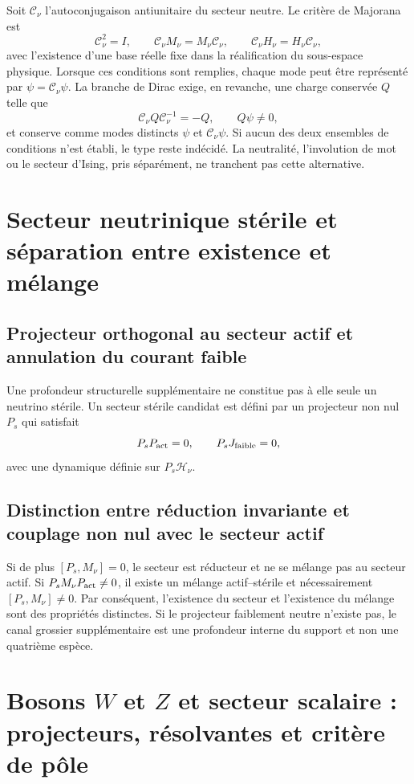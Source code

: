 Soit \(\mathcal C_\nu\) l'autoconjugaison antiunitaire du secteur neutre. Le
critère de Majorana est
\[
 \mathcal C_\nu^2=I,
 \qquad
 \mathcal C_\nu M_\nu=M_\nu\mathcal C_\nu,
 \qquad
 \mathcal C_\nu H_\nu=H_\nu\mathcal C_\nu,
\]
avec l'existence d'une base réelle fixe dans la réalification du
sous-espace physique. Lorsque ces conditions sont remplies, chaque mode peut
être représenté par \(\psi=\mathcal C_\nu\psi\). La branche de Dirac exige, en
revanche, une charge conservée \(Q\) telle que
\[
 \mathcal C_\nu Q\mathcal C_\nu^{-1}=-Q,
 \qquad Q\psi\ne0,
\]
et conserve comme modes distincts \(\psi\) et \(\mathcal C_\nu\psi\). Si aucun
des deux ensembles de conditions n'est établi, le type reste indécidé.
La neutralité, l'involution de mot ou le secteur d'Ising, pris
séparément, ne tranchent pas cette alternative.

\section{Secteur neutrinique stérile et séparation entre existence et mélange}

\subsection{Projecteur orthogonal au secteur actif et annulation du courant faible}

Une profondeur structurelle supplémentaire ne constitue pas à elle seule un neutrino
stérile. Un secteur stérile candidat est défini par un projecteur non nul
\(P_s\) qui satisfait
\[
 P_s P_{\rm act}=0,
 \qquad P_s J_{\text{faible}}=0,
\]
avec une dynamique définie sur \(P_s\mathcal H_\nu\).

\subsection{Distinction entre réduction invariante et couplage non nul avec le secteur actif}

Si de plus \([P_s,M_\nu]=0\), le secteur est réducteur et ne se mélange pas au secteur actif. Si \(P_sM_\nu P_{\rm act}\ne0\), il existe un mélange actif--stérile et nécessairement \([P_s,M_\nu]\ne0\). Par conséquent, l'existence du secteur et l'existence du mélange sont des propriétés distinctes. Si le projecteur faiblement neutre n'existe pas, le canal grossier supplémentaire est une profondeur interne du support et non une quatrième espèce.

\section{Bosons \texorpdfstring{\(W\) et \(Z\)}{W et Z} et secteur scalaire : projecteurs, résolvantes et critère de pôle}

